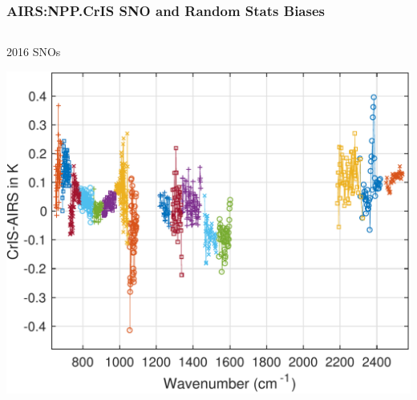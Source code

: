 \documentclass[10pt,t]{beamer}
\begin{document}
\begin{frame}
\frametitle{AIRS:NPP.CrIS SNO and Random Stats Biases}
\vspace{-0.2in}
\begin{columns}
  \begin{column}{0.55\columnwidth}
      \begin{block}{2016 SNOs}
\vspace{-0.15in}
        \begin{center}
          \includegraphics[width=\linewidth]{./Figs/snpp_vs_airs_sno.pdf}
        \end{center}
      \end{block}
    \end{column}


\end{columns}
\end{frame}
\end{document}
